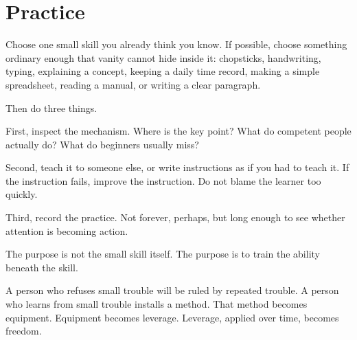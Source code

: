 \section*{Practice}

Choose one small skill you already think you know. If possible, choose something ordinary enough that vanity cannot hide inside it: chopsticks, handwriting, typing, explaining a concept, keeping a daily time record, making a simple spreadsheet, reading a manual, or writing a clear paragraph.

Then do three things.

First, inspect the mechanism. Where is the key point? What do competent people actually do? What do beginners usually miss?

Second, teach it to someone else, or write instructions as if you had to teach it. If the instruction fails, improve the instruction. Do not blame the learner too quickly.

Third, record the practice. Not forever, perhaps, but long enough to see whether attention is becoming action.

The purpose is not the small skill itself. The purpose is to train the ability beneath the skill.

A person who refuses small trouble will be ruled by repeated trouble. A person who learns from small trouble installs a method. That method becomes equipment. Equipment becomes leverage. Leverage, applied over time, becomes freedom.

